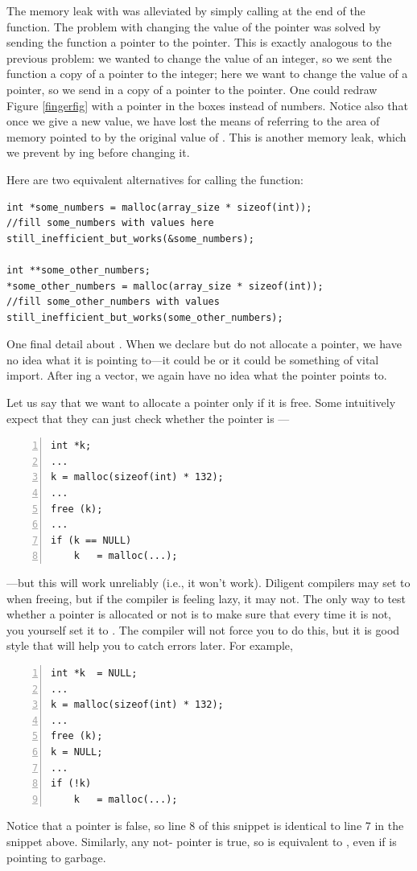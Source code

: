 The memory leak with  was alleviated by simply
calling  at the end of the function. The problem with
changing the value of the pointer was solved by sending the function a
pointer to the pointer. This is exactly analogous to the previous problem:
we wanted to change the value of an integer, so we sent the function a
copy of a pointer to the integer; here we want to change the value of a
pointer, so we send in a copy of a pointer to the pointer. One could
redraw Figure \ref{fingerfig} with a pointer in the boxes instead of
numbers. Notice also
that once we give  a new value, we have lost the
means of referring to the area of memory pointed to by the original
value of . This is another memory leak, which we
prevent by ing  before changing it.

Here are two equivalent alternatives for calling the function:
\begin{lstlisting}
int *some_numbers = malloc(array_size * sizeof(int));
//fill some_numbers with values here
still_inefficient_but_works(&some_numbers);

int **some_other_numbers;
*some_other_numbers = malloc(array_size * sizeof(int));
//fill some_other_numbers with values
still_inefficient_but_works(some_other_numbers);
\end{lstlisting}

One final detail about . When we declare but do not allocate a
pointer, we have no idea what it is pointing to---it could be 
or it could be something of vital import. After ing a vector,
we again have no idea what the pointer points to.

Let us say that we want to allocate a pointer only if it is free. Some
intuitively expect that they can just check whether the pointer is
---
\begin{lstlisting}[numbers=left, numberstyle=\scshape]
int *k;
...
k = malloc(sizeof(int) * 132); 
...
free (k);
...
if (k == NULL)
    k   = malloc(...);
\end{lstlisting}
---but this will work unreliably (i.e., it won't work). Diligent compilers
may set  to  when freeing, but if the compiler is feeling
lazy, it may not. The only way
to test whether a pointer is allocated or not is to make sure that every
time it is not, you yourself set it to . The compiler will not
force you to do this, but it is good style that will help you to catch
errors later. For example,
\begin{lstlisting}[numbers=left, numberstyle=\scshape]
int *k  = NULL;
...
k = malloc(sizeof(int) * 132); 
...
free (k); 
k = NULL;
...
if (!k)
    k   = malloc(...);
\end{lstlisting}
Notice that a  pointer is false, so line 8 of this snippet is
identical to line 7 in the snippet above.
Similarly, any not- pointer is true,
so  is equivalent to , even if  is pointing
to garbage.


